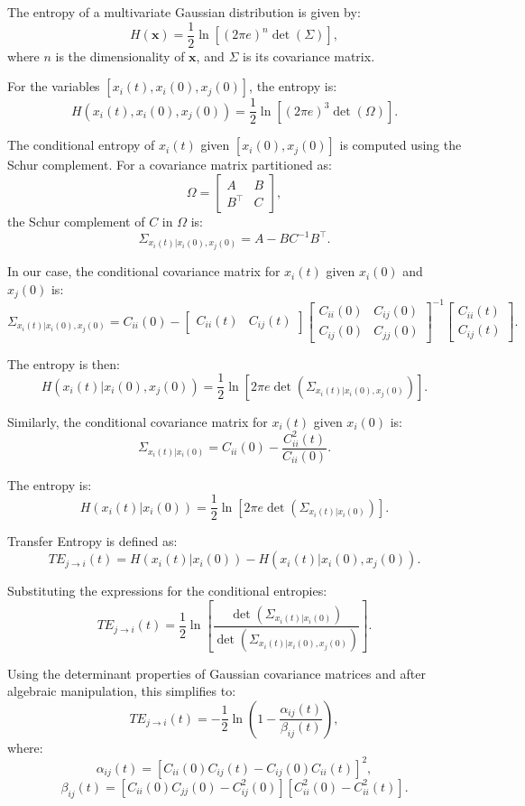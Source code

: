 \documentclass[English, Lau, oneside]{sapthesis}
\begin{document}
The entropy of a multivariate Gaussian distribution is given by:
\[
H(\mathbf{x}) = \frac{1}{2} \ln{[(2\pi e)^n \det(\Sigma)]},
\]
where \(n\) is the dimensionality of \(\mathbf{x}\), and \(\Sigma\) is its covariance matrix.

For the variables \([x_i(t), x_i(0), x_j(0)]\), the entropy is:
\[
H(x_i(t), x_i(0), x_j(0)) = \frac{1}{2} \ln{[(2\pi e)^3 \det(\Omega)]}.
\]


The conditional entropy of \(x_i(t)\) given \([x_i(0), x_j(0)]\) is computed using the Schur complement. For a covariance matrix partitioned as:
\[
\Omega = \begin{bmatrix}
A & B \\
B^\top & C
\end{bmatrix},
\]
the Schur complement of \(C\) in \(\Omega\) is:
\[
\Sigma_{x_i(t) | x_i(0), x_j(0)} = A - B C^{-1} B^\top.
\]

In our case, the conditional covariance matrix for \(x_i(t)\) given \(x_i(0)\) and \(x_j(0)\) is:
\[
\Sigma_{x_i(t) | x_i(0), x_j(0)} = C_{ii}(0) - \begin{bmatrix}
C_{ii}(t) & C_{ij}(t)
\end{bmatrix}
\begin{bmatrix}
C_{ii}(0) & C_{ij}(0) \\
C_{ij}(0) & C_{jj}(0)
\end{bmatrix}^{-1}
\begin{bmatrix}
C_{ii}(t) \\
C_{ij}(t)
\end{bmatrix}.
\]

The entropy is then:
\[
H(x_i(t) | x_i(0), x_j(0)) = \frac{1}{2} \ln{[2\pi e \det\left(\Sigma_{x_i(t) | x_i(0), x_j(0)}\right)]}.
\]

Similarly, the conditional covariance matrix for \(x_i(t)\) given \(x_i(0)\) is:
\[
\Sigma_{x_i(t) | x_i(0)} = C_{ii}(0) - \frac{C_{ii}^2(t)}{C_{ii}(0)}.
\]

The entropy is:
\[
H(x_i(t) | x_i(0)) = \frac{1}{2} \ln{[2\pi e \det\left(\Sigma_{x_i(t) | x_i(0)}\right)]}.
\]


Transfer Entropy is defined as:
\[
TE_{j \to i}(t) = H(x_i(t) | x_i(0)) - H(x_i(t) | x_i(0), x_j(0)).
\]

Substituting the expressions for the conditional entropies:
\[
TE_{j \to i}(t) = \frac{1}{2} \ln{[\frac{\det{(\Sigma_{x_i(t) | x_i(0)})}}{\det{(\Sigma_{x_i(t) | x_i(0), x_j(0)})}}]}.
\]

Using the determinant properties of Gaussian covariance matrices and after algebraic manipulation, this simplifies to:
\[
TE_{j \to i}(t) = -\frac{1}{2} \ln {(1 - \frac{\alpha_{ij}(t)}{\beta_{ij}(t)})},
\]
where:
\[
\alpha_{ij}(t) = \left[C_{ii}(0)C_{ij}(t) - C_{ij}(0)C_{ii}(t)\right]^2,
\]
\[
\beta_{ij}(t) = \left[C_{ii}(0)C_{jj}(0) - C_{ij}^2(0)\right]\left[C_{ii}^2(0) - C_{ii}^2(t)\right].
\]
\end{document}
